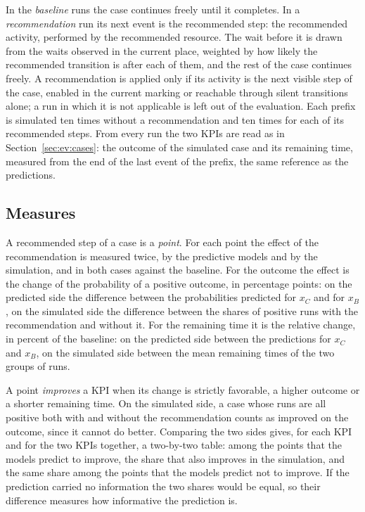 In the \emph{baseline} runs the case continues freely until it completes. In
a \emph{recommendation} run its next event is the recommended step: the
recommended activity, performed by the recommended resource. The wait before
it is drawn from the waits observed in the current place, weighted by how
likely the recommended transition is after each of them, and the rest of the
case continues freely. A recommendation is applied only if its activity is
the next visible step of the case, enabled in the current marking or
reachable through silent transitions alone; a run in which it is not
applicable is left out of the evaluation. Each prefix is simulated ten times
without a recommendation and ten times for each of its recommended steps.
From every run the two KPIs are read as in Section~\ref{sec:ev:cases}: the
outcome of the simulated case and its remaining time, measured from the end
of the last event of the prefix, the same reference as the predictions.

\subsection{Measures}
\label{subsec:ev:sim:measures}
A recommended step of a case is a \emph{point}. For each point the effect of
the recommendation is measured twice, by the predictive models and by the
simulation, and in both cases against the baseline. For the outcome the
effect is the change of the probability of a positive outcome, in
percentage points: on the predicted side the difference between the
probabilities predicted for $x_C$ and for $x_B$, on the simulated side the
difference between the shares of positive runs with the recommendation and
without it. For the remaining time it is the relative change, in percent of
the baseline: on the predicted side between the predictions for $x_C$ and
$x_B$, on the simulated side between the mean remaining times of the two
groups of runs.

A point \emph{improves} a KPI when its change is strictly favorable, a
higher outcome or a shorter remaining time. On the simulated side, a case
whose runs are all positive both with and without the recommendation counts
as improved on the outcome, since it cannot do better. Comparing the two
sides gives, for each KPI and for the two KPIs together, a two-by-two table:
among the points that the models predict to improve, the share that also
improves in the simulation, and the same share among the points that the
models predict not to improve. If the prediction carried no information the
two shares would be equal, so their difference measures how informative the
prediction is.

